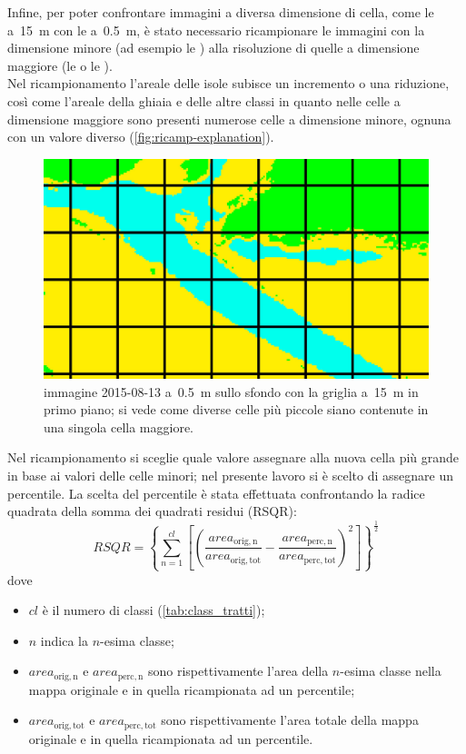 Infine, per poter confrontare immagini a diversa dimensione di cella, come le \AST{} a~\SI{15}{\m} con le \Pl{} a~\SI{0.5}{\m}, è stato necessario ricampionare le immagini con la dimensione minore (ad esempio le \Pl{}) alla risoluzione di quelle a dimensione maggiore (le \AST{} o le \Se{}).
\\
Nel ricampionamento l'areale delle isole subisce un incremento o una riduzione, così come l'areale della ghiaia e delle altre classi in quanto nelle celle a dimensione maggiore sono presenti numerose celle a dimensione minore, ognuna con un valore diverso (\vref{fig:ricamp-explanation}).
%
\begin{figure}
	\centering
	\includegraphics[width=.9\textwidth]{files/ricamp_griglia.jpeg}
	\caption[celle a risoluzione diversa]{immagine \Pl{} 2015-08-13 a~\SI{0.5}{\m} sullo sfondo con la griglia a~\SI{15}{\m} in primo piano; si vede come diverse celle più piccole siano contenute in una singola cella maggiore.}
	\label{fig:ricamp-explanation}
\end{figure}
%
Nel ricampionamento si sceglie quale valore assegnare alla nuova cella più grande in base ai valori delle celle minori; nel presente lavoro si è scelto di assegnare un percentile.
La scelta del percentile è stata effettuata confrontando la radice quadrata della somma dei quadrati residui (RSQR):
%
\begin{equation}
	\label{eq:rad-som-quad-res}
	RSQR = \left\lbrace \sum_{n=1}^{cl} \left[\left( \frac{area_{\mathrm{orig,n}}}{area_{\mathrm{orig,tot}}} - \frac{area_{\mathrm{perc,n}}}{area_{\mathrm{perc,tot}}} \right)^2 \right] \right\rbrace ^ \frac{1}{2}	
\end{equation}
%
dove 
\begin{itemize}
	\item $cl$ è il numero di classi (\vref{tab:class_tratti});
	\item $n$ indica la $n$-esima classe;
	\item $area_{\mathrm{orig,n}}$ e $area_{\mathrm{perc,n}}$ sono rispettivamente l'area della $n$-esima classe nella mappa originale e in quella ricampionata ad un percentile;
	\item $area_{\mathrm{orig,tot}}$ e $area_{\mathrm{perc,tot}}$ sono rispettivamente l'area totale della mappa originale e in quella ricampionata ad un percentile. 
\end{itemize} 
